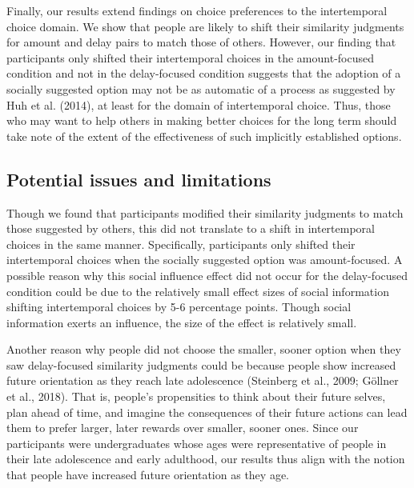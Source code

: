 \documentclass[
  pub,floatsintext]{apa6}
\begin{document}
Finally, our results extend findings on choice preferences to the intertemporal choice domain. We show that people are likely to shift their similarity judgments for amount and delay pairs to match those of others. However, our finding that participants only shifted their intertemporal choices in the amount-focused condition and not in the delay-focused condition suggests that the adoption of a socially suggested option may not be as automatic of a process as suggested by Huh et al. (2014), at least for the domain of intertemporal choice. Thus, those who may want to help others in making better choices for the long term should take note of the extent of the effectiveness of such implicitly established options.

\hypertarget{potential-issues-and-limitations}{%
\subsection{Potential issues and limitations}\label{potential-issues-and-limitations}}

Though we found that participants modified their similarity judgments to match those suggested by others, this did not translate to a shift in intertemporal choices in the same manner. Specifically, participants only shifted their intertemporal choices when the socially suggested option was amount-focused. A possible reason why this social influence effect did not occur for the delay-focused condition could be due to the relatively small effect sizes of social information shifting intertemporal choices by 5-6 percentage points. Though social information exerts an influence, the size of the effect is relatively small.

Another reason why people did not choose the smaller, sooner option when they saw delay-focused similarity judgments could be because people show increased future orientation as they reach late adolescence (Steinberg et al., 2009; Göllner et al., 2018). That is, people's propensities to think about their future selves, plan ahead of time, and imagine the consequences of their future actions can lead them to prefer larger, later rewards over smaller, sooner ones. Since our participants were undergraduates whose ages were representative of people in their late adolescence and early adulthood, our results thus align with the notion that people have increased future orientation as they age.
\end{document}
